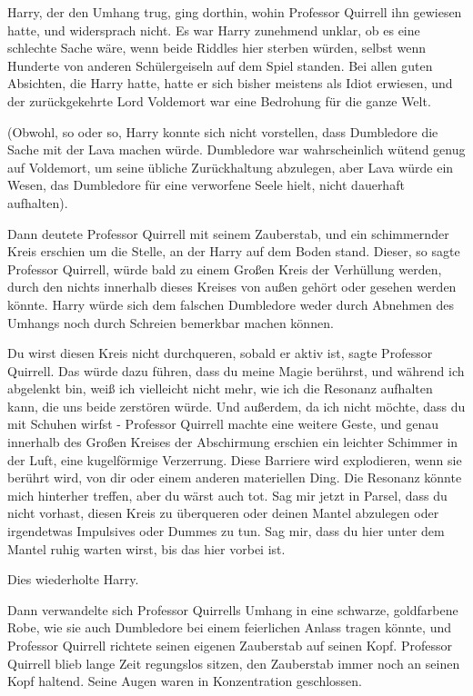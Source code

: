 Harry, der den Umhang trug, ging dorthin, wohin Professor Quirrell ihn gewiesen
hatte, und widersprach nicht. Es war Harry zunehmend unklar, ob es eine
schlechte Sache wäre, wenn beide Riddles hier sterben würden, selbst wenn
Hunderte von anderen Schülergeiseln auf dem Spiel standen. Bei allen guten
Absichten, die Harry hatte, hatte er sich bisher meistens als Idiot erwiesen,
und der zurückgekehrte Lord Voldemort war eine Bedrohung für die ganze Welt.

(Obwohl, so oder so, Harry konnte sich nicht vorstellen, dass Dumbledore die
Sache mit der Lava machen würde. Dumbledore war wahrscheinlich wütend genug auf
Voldemort, um seine übliche Zurückhaltung abzulegen, aber Lava würde ein Wesen,
das Dumbledore für eine verworfene Seele hielt, nicht dauerhaft aufhalten).

Dann deutete Professor Quirrell mit seinem Zauberstab, und ein schimmernder
Kreis erschien um die Stelle, an der Harry auf dem Boden stand. Dieser, so sagte
Professor Quirrell, würde bald zu einem Großen Kreis der Verhüllung werden,
durch den nichts innerhalb dieses Kreises von außen gehört oder gesehen werden
könnte. Harry würde sich dem falschen Dumbledore weder durch Abnehmen des
Umhangs noch durch Schreien bemerkbar machen können.

\glqq{}Du wirst diesen Kreis nicht durchqueren, sobald er aktiv ist\grqq{}, sagte
Professor Quirrell. \glqq{}Das würde dazu führen, dass du meine Magie berührst,
und während ich abgelenkt bin, weiß ich vielleicht nicht mehr, wie ich die
Resonanz aufhalten kann, die uns beide zerstören würde. Und außerdem, da ich
nicht möchte, dass du mit Schuhen wirfst -\grqq{} Professor Quirrell machte eine
weitere Geste, und genau innerhalb des Großen Kreises der Abschirmung erschien
ein leichter Schimmer in der Luft, eine kugelförmige Verzerrung. \glqq{}Diese
Barriere wird explodieren, wenn sie berührt wird, von dir oder einem anderen
materiellen Ding. Die Resonanz könnte mich hinterher treffen, aber du wärst auch
tot. Sag mir jetzt in Parsel, dass du nicht vorhast, diesen Kreis zu überqueren
oder deinen Mantel abzulegen oder irgendetwas Impulsives oder Dummes zu tun. Sag
mir, dass du hier unter dem Mantel ruhig warten wirst, bis das hier vorbei
ist.\grqq{}

Dies wiederholte Harry.

Dann verwandelte sich Professor Quirrells Umhang in eine schwarze, goldfarbene
Robe, wie sie auch Dumbledore bei einem feierlichen Anlass tragen könnte, und
Professor Quirrell richtete seinen eigenen Zauberstab auf seinen Kopf. Professor
Quirrell blieb lange Zeit regungslos sitzen, den Zauberstab immer noch an seinen
Kopf haltend. Seine Augen waren in Konzentration geschlossen.

